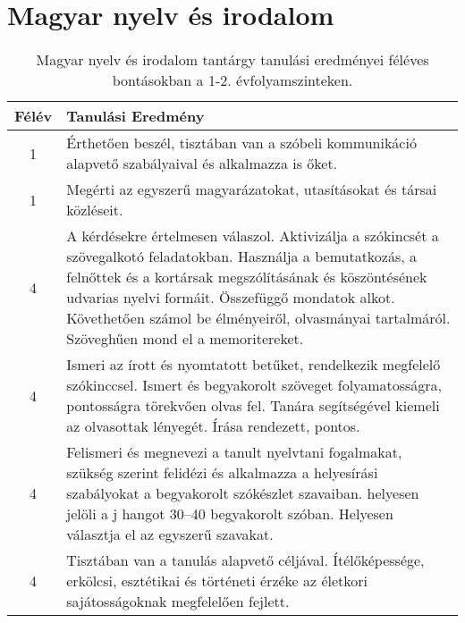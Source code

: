         \section{Magyar nyelv és irodalom}

       
           \begin{longtable}{c | p{} }
            \caption[Magyar nyelv és irodalom 1-2.]{Magyar nyelv és irodalom tantárgy tanulási eredményei féléves bontásokban a 1-2. évfolyamszinteken. }  \\

            \textbf{Félév} & \textbf{Tanulási Eredmény} \\
            \hline
            \endhead
                                
                                          1 &  Érthetően beszél, tisztában van a szóbeli kommunikáció alapvető szabályaival és alkalmazza is őket. \\ \hline
                                          1 &  Megérti az egyszerű magyarázatokat, utasításokat és társai közléseit. \\ \hline
                                      
                                
                                          4 &  A kérdésekre értelmesen válaszol. Aktivizálja a szókincsét a szövegalkotó feladatokban. Használja a bemutatkozás, a felnőttek és a kortársak megszólításának és köszöntésének udvarias nyelvi formáit. Összefüggő mondatok alkot. Követhetően számol be élményeiről, olvasmányai tartalmáról. Szöveghűen mond el a memoritereket. \\ \hline
                                          4 &  Ismeri az írott és nyomtatott betűket, rendelkezik megfelelő szókinccsel. Ismert és begyakorolt szöveget folyamatosságra, pontosságra törekvően olvas fel. Tanára segítségével kiemeli az olvasottak lényegét. Írása rendezett, pontos. \\ \hline
                                          4 &  Felismeri és megnevezi a tanult nyelvtani fogalmakat, szükség szerint felidézi és alkalmazza a helyesírási szabályokat a begyakorolt szókészlet szavaiban. helyesen jelöli a j hangot 30–40 begyakorolt szóban. Helyesen választja el az egyszerű szavakat. \\ \hline
                                          4 &  Tisztában van a tanulás alapvető céljával. Ítélőképessége, erkölcsi, esztétikai és történeti érzéke az életkori sajátosságoknak megfelelően fejlett. \\ \hline
                                      
                        \end{longtable}
            \clearpage

